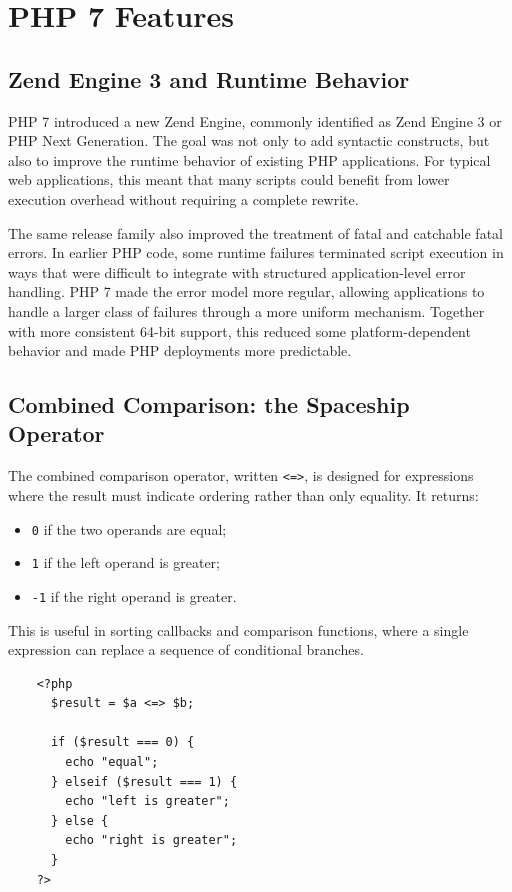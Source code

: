 \documentclass{scrbook}
\begin{document}
	\section{PHP 7 Features}
	
	\subsection{Zend Engine 3 and Runtime Behavior}
	
	PHP 7 introduced a new Zend Engine, commonly identified as Zend Engine 3 or PHP Next Generation. The goal was not only to add syntactic constructs, but also to improve the runtime behavior of existing PHP applications. For typical web applications, this meant that many scripts could benefit from lower execution overhead without requiring a complete rewrite.
	
	The same release family also improved the treatment of fatal and catchable fatal errors. In earlier PHP code, some runtime failures terminated script execution in ways that were difficult to integrate with structured application-level error handling. PHP 7 made the error model more regular, allowing applications to handle a larger class of failures through a more uniform mechanism. Together with more consistent 64-bit support, this reduced some platform-dependent behavior and made PHP deployments more predictable.
	
	\subsection{Combined Comparison: the Spaceship Operator}
	
	The combined comparison operator, written \texttt{<=>}, is designed for expressions where the result must indicate ordering rather than only equality. It returns:
	\begin{itemize}
		\item \texttt{0} if the two operands are equal;
		\item \texttt{1} if the left operand is greater;
		\item \texttt{-1} if the right operand is greater.
	\end{itemize}
	
	This is useful in sorting callbacks and comparison functions, where a single expression can replace a sequence of conditional branches.
	
	\begin{lstlisting}
	<?php
	  $result = $a <=> $b;
	
	  if ($result === 0) {
		echo "equal";
	  } elseif ($result === 1) {
		echo "left is greater";
	  } else {
		echo "right is greater";
	  }
	?>
	\end{lstlisting}
	
\end{document}
